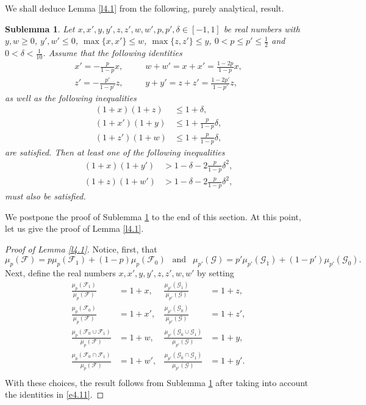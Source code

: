 \documentclass[10pt,a4paper]{amsart}
\newtheorem{sbl}[thm]{Sublemma}
\theoremstyle{remark}
\newcommand{\meg}{\geqslant}
\newcommand{\mik}{\leqslant}
\newcommand{\Fcal}{\mathcal{F}}
\newcommand{\Gcal}{\mathcal{G}}
\newcommand{\pmeasure}[1]{\ensuremath{\mu_{p}\left(#1\right)}}
\begin{document}
We shall deduce Lemma \ref{l4.1} from the following, purely analytical, result.
\begin{sbl} \label{s4.2}
Let $x,x',y,y',z,z',w,w',p,p',\delta\in[-1,1]$ be real numbers with $y,w\meg 0$, $y',w'\mik 0$,
$\max\{x,x'\}\mik w$, $\max\{z,z'\}\mik y$, $0<p\mik p'\mik \frac{1}{2}$ and $0<\delta<\frac{1}{10}$.
Assume that the following identities
\begin{align}
\label{e4.4} x'=-\frac{p}{1-p}x,  & \ \ \ \ \ \ \ \ w+w'=x+x'=\frac{1-2p}{1-p}x, \\
\label{e4.5} z'=-\frac{p'}{1-p'}z, & \ \ \ \ \ \ \ \ y+y'=z+z'=\frac{1-2p'}{1-p'}z,
\end{align}
as well as the following inequalities
\begin{align}
\label{e4.6} (1+x)(1+z)& \mik 1+\delta, \\
\label{e4.7} (1+x')(1+y) & \mik 1+\frac{p}{1-p}\delta,\\
\label{e4.8} (1+z')(1+w) & \mik 1+\frac{p}{1-p}\delta,
\end{align}
are satisfied. Then at least one of the following inequalities
\begin{align}
\label{e4.9} (1+x)(1+y') & > 1-\delta-2\frac{p}{1-p}\delta^2, \\
\label{e4.10} (1+z)(1+w')& > 1-\delta-2\frac{p}{1-p}\delta^2,
\end{align}
must also be satisfied.
\end{sbl}
We postpone the proof of Sublemma \ref{s4.2} to the end of this section. At this point, let us
give the proof of Lemma \ref{l4.1}.
\begin{proof}[Proof of Lemma \emph{\ref{l4.1}}]
Notice, first, that
\begin{equation} \label{e4.11}
\mu_p(\Fcal)=p\mu_p(\Fcal_1) +(1-p)\mu_p(\Fcal_0) \ \ \text{ and } \ \
\mu_{p'}(\Gcal)=p'\mu_{p'}(\Gcal_1) +(1-p')\mu_{p'}(\Gcal_0).
\end{equation}
Next, define the real numbers $x,x',y,y',z,z',w,w'$ by setting
\begin{align*}
\frac{\mu_p(\Fcal_1)}{\mu_p(\Fcal)}&=1+x, & \frac{\mu_{p'}(\Gcal_1)}{\mu_{p'}(\Gcal)} & = 1+z,\\
\frac{\mu_p(\Fcal_0)}{\mu_p(\Fcal)}&=1+x' ,&	\frac{\mu_{p'}(\Gcal_0)}{\mu_{p'}(\Gcal)} & =1+z',\\
\frac{\mu_p(\Fcal_0\cup\Fcal_1)}{\mu_p(\Fcal)}& = 1+w, & \frac{\mu_{p'}(\Gcal_0\cup\Gcal_1)}{\mu_{p'}(\Gcal)} & =1+y,\\
\frac{\mu_p(\Fcal_0\cap\Fcal_1)}{\pmeasure{\Fcal}}&=1+w', & \frac{\mu_{p'}(\Gcal_0\cap\Gcal_1)}{\mu_{p'}(\Gcal)} & =1+y'.\\
\end{align*}
With these choices, the result follows from Sublemma \ref{s4.2} after taking into account the identities in \eqref{e4.11}.
\end{proof}
\end{document}
